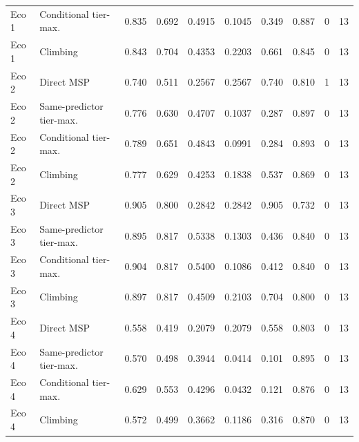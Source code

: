 \begin{table}[htbp]
\begin{tabular}{llrrrrrrrr}
Eco 1 & Conditional tier-max. & 0.835 & 0.692 & 0.4915 & 0.1045 & 0.349 & 0.887 & 0 & 13 \\
Eco 1 & Climbing & 0.843 & 0.704 & 0.4353 & 0.2203 & 0.661 & 0.845 & 0 & 13 \\
Eco 2 & Direct MSP & 0.740 & 0.511 & 0.2567 & 0.2567 & 0.740 & 0.810 & 1 & 13 \\
Eco 2 & Same-predictor tier-max. & 0.776 & 0.630 & 0.4707 & 0.1037 & 0.287 & 0.897 & 0 & 13 \\
Eco 2 & Conditional tier-max. & 0.789 & 0.651 & 0.4843 & 0.0991 & 0.284 & 0.893 & 0 & 13 \\
Eco 2 & Climbing & 0.777 & 0.629 & 0.4253 & 0.1838 & 0.537 & 0.869 & 0 & 13 \\
Eco 3 & Direct MSP & 0.905 & 0.800 & 0.2842 & 0.2842 & 0.905 & 0.732 & 0 & 13 \\
Eco 3 & Same-predictor tier-max. & 0.895 & 0.817 & 0.5338 & 0.1303 & 0.436 & 0.840 & 0 & 13 \\
Eco 3 & Conditional tier-max. & 0.904 & 0.817 & 0.5400 & 0.1086 & 0.412 & 0.840 & 0 & 13 \\
Eco 3 & Climbing & 0.897 & 0.817 & 0.4509 & 0.2103 & 0.704 & 0.800 & 0 & 13 \\
Eco 4 & Direct MSP & 0.558 & 0.419 & 0.2079 & 0.2079 & 0.558 & 0.803 & 0 & 13 \\
Eco 4 & Same-predictor tier-max. & 0.570 & 0.498 & 0.3944 & 0.0414 & 0.101 & 0.895 & 0 & 13 \\
Eco 4 & Conditional tier-max. & 0.629 & 0.553 & 0.4296 & 0.0432 & 0.121 & 0.876 & 0 & 13 \\
Eco 4 & Climbing & 0.572 & 0.499 & 0.3662 & 0.1186 & 0.316 & 0.870 & 0 & 13 \\
\bottomrule
\end{tabular}
\end{table}
